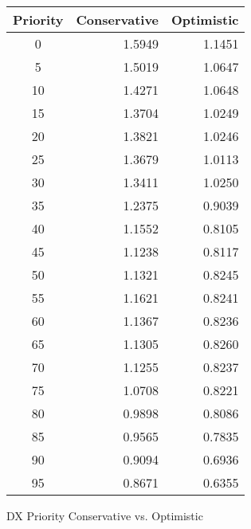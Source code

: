 \documentclass[a4paper, 11pt]{article}
\begin{document}
\begin{figure}
\begin{center}
\begin{tabular}{|c|r|r|}
\hline
Priority&Conservative&Optimistic \\
\hline
0&1.5949&1.1451\\
5&1.5019&1.0647\\
10&1.4271&1.0648\\
15&1.3704&1.0249\\
20&1.3821&1.0246\\
25&1.3679&1.0113\\
30&1.3411&1.0250\\
35&1.2375&0.9039\\
40&1.1552&0.8105\\
45&1.1238&0.8117\\
50&1.1321&0.8245\\
55&1.1621&0.8241\\
60&1.1367&0.8236\\
65&1.1305&0.8260\\
70&1.1255&0.8237\\
75&1.0708&0.8221\\
80&0.9898&0.8086\\
85&0.9565&0.7835\\
90&0.9094&0.6936\\
95&0.8671&0.6355\\
\hline
\end{tabular}
\end{center}
\caption{DX Priority Conservative vs. Optimistic}
\end{figure}
\end{document}
